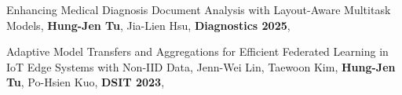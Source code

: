 %
\resumeSubHeadingListStart
  \small
  \item Enhancing Medical Diagnosis Document Analysis with Layout-Aware Multitask Models,
    \textbf{Hung-Jen Tu}, Jia-Lien Hsu,
    \textbf{Diagnostics 2025},
  \item Adaptive Model Transfers and Aggregations for Efficient Federated Learning in IoT Edge Systems with Non-IID Data,
    Jenn-Wei Lin, Taewoon Kim, \textbf{Hung-Jen Tu}, Po-Hsien Kuo,
    \textbf{DSIT 2023},
\resumeSubHeadingListEnd
